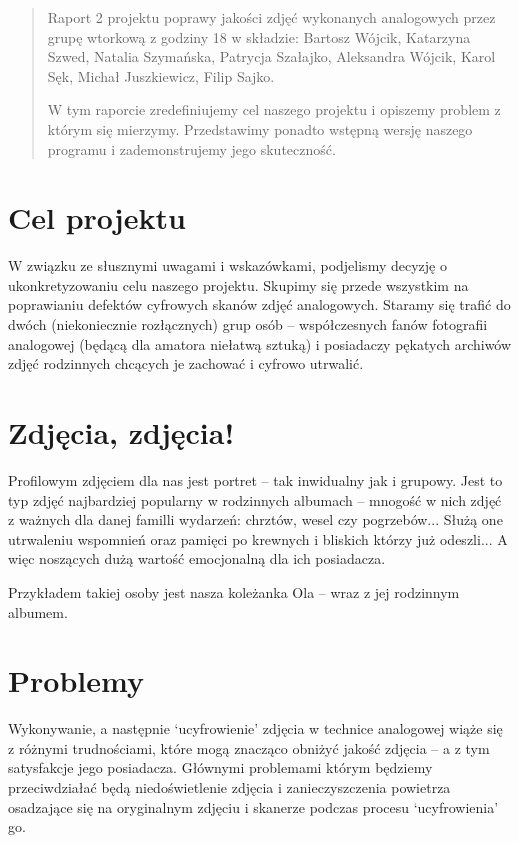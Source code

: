 \documentclass[]{mwart}
\begin{document}
\vfill
\begin{abstract}
    Raport 2 projektu poprawy jakości zdjęć wykonanych analogowych przez grupę wtorkową z godziny 18
    w składzie:  Bartosz Wójcik, Katarzyna Szwed, Natalia Szymańska,
    Patrycja Szałajko, Aleksandra Wójcik, Karol Sęk, Michał Juszkiewicz, Filip Sajko.

    W tym raporcie zredefiniujemy cel naszego projektu i opiszemy problem z którym się mierzymy.
    Przedstawimy ponadto wstępną wersję naszego programu i zademonstrujemy jego skuteczność.
\end{abstract}

\newpage
\tableofcontents{}

\newpage

\section{Cel projektu}
W związku ze słusznymi uwagami i wskazówkami, podjelismy decyzję o ukonkretyzowaniu celu naszego projektu.
Skupimy się przede wszystkim na poprawianiu defektów cyfrowych skanów zdjęć analogowych.
Staramy się trafić do dwóch (niekoniecznie rozłącznych) grup osób --
współczesnych fanów fotografii analogowej (będącą dla amatora niełatwą sztuką) i posiadaczy pękatych
archiwów zdjęć rodzinnych chcących je zachować i cyfrowo utrwalić.

\section{Zdjęcia, zdjęcia!}
Profilowym zdjęciem dla nas jest portret -- tak inwidualny jak i grupowy.
Jest to typ zdjęć najbardziej popularny w rodzinnych albumach -- mnogość w nich zdjęć z ważnych
dla danej familli wydarzeń: chrztów, wesel czy pogrzebów... Służą one utrwaleniu wspomnień oraz pamięci
po krewnych i bliskich którzy już odeszli... A więc noszących dużą wartość emocjonalną dla ich posiadacza.

Przykładem takiej osoby jest nasza koleżanka Ola -- wraz z jej rodzinnym albumem.

\section{Problemy}
Wykonywanie, a następnie `ucyfrowienie' zdjęcia w technice analogowej wiąże się z różnymi trudnościami,
które mogą znacząco obniżyć jakość zdjęcia -- a z tym satysfakcje jego posiadacza. Głównymi problemami
którym będziemy przeciwdziałać będą niedoświetlenie zdjęcia i zanieczyszczenia powietrza osadzające
się na oryginalnym zdjęciu i skanerze podczas procesu `ucyfrowienia' go.
\end{document}
